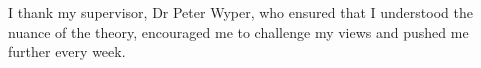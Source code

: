 I thank my supervisor, Dr Peter Wyper, who ensured that I understood the nuance of the theory, encouraged me to challenge my views and pushed me further every week.